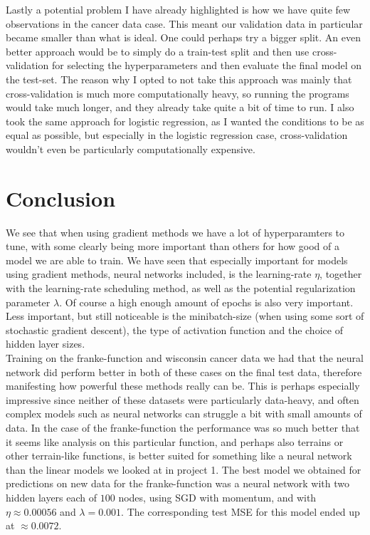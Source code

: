 \documentclass{article}
\begin{document}
Lastly a potential problem I have already highlighted is how we have quite few
observations in the cancer data case. This meant our validation data in
particular became smaller than what is ideal. One could perhaps try a
bigger split. An even better approach would be to simply do a train-test split
and then use cross-validation for selecting the hyperparameters and then
evaluate the final model on the test-set. The reason why I opted to not take
this approach was mainly that cross-validation is much more computationally
heavy, so running the programs would take much longer, and they already take
quite a bit of time to run. I also took the same approach for logistic
regression, as I wanted the conditions to be as equal as possible, but
especially in the logistic regression case, cross-validation wouldn't even be
particularly computationally expensive.

\section{Conclusion}
We see that when using gradient methods we have a lot of hyperparamters to tune,
with some clearly being more important than others for how good of a model we
are able to train. We have seen that especially important for models using
gradient methods, neural networks included, is the learning-rate $\eta$,
together with the learning-rate scheduling method, as well as the potential
regularization parameter $\lambda$. Of course a high enough amount of epochs is
also very important. Less important, but still noticeable is the minibatch-size
(when using some sort of stochastic gradient descent), the type of
activation function and the choice of hidden layer sizes.
\\

Training on the franke-function and wisconsin cancer data we had that the
neural network did perform better in both of these cases on the final test data,
therefore manifesting how powerful these methods really can be. This is perhaps
especially impressive since neither of these datasets were particularly
data-heavy, and often complex models such as neural networks can struggle a
bit with small amounts of data. In the case of the franke-function the
performance was so much better that it seems like analysis on this particular
function, and perhaps also terrains or other terrain-like functions, is better
suited for something like a neural network than the linear models we looked at
in project 1. The best model we obtained for predictions on new data for the
franke-function was a neural network with two hidden layers each of $100$ nodes,
using SGD with momentum, and with $\eta \approx 0.00056$ and $\lambda = 0.001$.
The corresponding test MSE for this model ended up at $\approx 0.0072$.
\\
\end{document}
